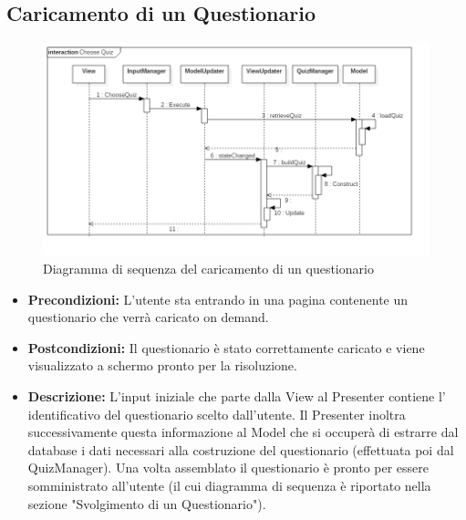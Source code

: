 \documentclass[a4paper,11pt]{article}
\begin{document}
	\subsection{Caricamento di un Questionario}
	\begin{figure}[h!]
	\begin{center}
		\includegraphics[scale=0.55]{../images/LoadQuiz.png}
		\caption{Diagramma di sequenza del caricamento di un questionario}
	\end{center}
	\end{figure}
	\begin{itemize}
	\item\textbf{Precondizioni:} L'utente sta entrando in una pagina contenente un questionario che verrà caricato on demand.\\
	\item\textbf{Postcondizioni:} Il questionario è stato correttamente caricato e viene visualizzato a schermo pronto per la risoluzione.\\
	\item\textbf{Descrizione:} L'input iniziale che parte dalla View al Presenter contiene l' identificativo del questionario scelto dall'utente. Il Presenter inoltra successivamente questa informazione al Model che si occuperà di estrarre dal database i dati necessari alla costruzione del questionario (effettuata poi dal QuizManager). Una volta assemblato il questionario è pronto per essere somministrato all'utente (il cui diagramma di sequenza è riportato nella sezione "Svolgimento di un Questionario").
	\end{itemize}
	\newpage
\end{document}
